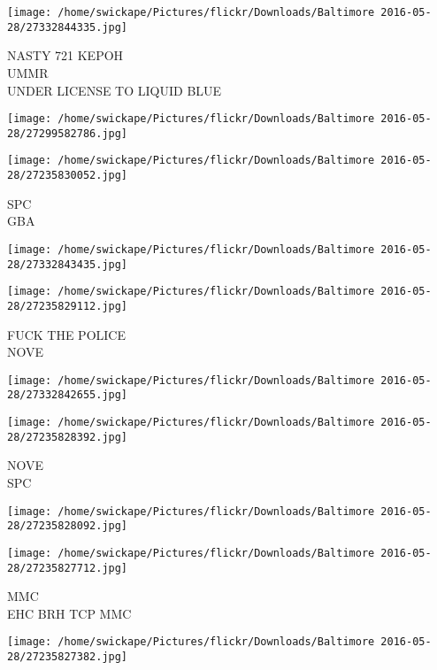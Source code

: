 \documentclass[10pt,letterpaper]{article}
\begin{document}
\texttt{[image: /home/swickape/Pictures/flickr/Downloads/Baltimore 2016-05-28/27332844335.jpg]}

NASTY 721 KEPOH\\
UMMR\\
UNDER LICENSE TO LIQUID BLUE\\
\pagebreak

\texttt{[image: /home/swickape/Pictures/flickr/Downloads/Baltimore 2016-05-28/27299582786.jpg]}

\vspace{0.25in}
\texttt{[image: /home/swickape/Pictures/flickr/Downloads/Baltimore 2016-05-28/27235830052.jpg]}

SPC\\
GBA\\
\pagebreak

\texttt{[image: /home/swickape/Pictures/flickr/Downloads/Baltimore 2016-05-28/27332843435.jpg]}

\vspace{0.25in}
\texttt{[image: /home/swickape/Pictures/flickr/Downloads/Baltimore 2016-05-28/27235829112.jpg]}

FUCK THE POLICE\\
NOVE\\
\pagebreak

\texttt{[image: /home/swickape/Pictures/flickr/Downloads/Baltimore 2016-05-28/27332842655.jpg]}

\vspace{0.25in}
\texttt{[image: /home/swickape/Pictures/flickr/Downloads/Baltimore 2016-05-28/27235828392.jpg]}

NOVE\\
SPC\\
\pagebreak

\texttt{[image: /home/swickape/Pictures/flickr/Downloads/Baltimore 2016-05-28/27235828092.jpg]}

\vspace{0.25in}
\texttt{[image: /home/swickape/Pictures/flickr/Downloads/Baltimore 2016-05-28/27235827712.jpg]}

MMC\\
EHC BRH TCP MMC\\
\pagebreak

\texttt{[image: /home/swickape/Pictures/flickr/Downloads/Baltimore 2016-05-28/27235827382.jpg]}
\end{document}
